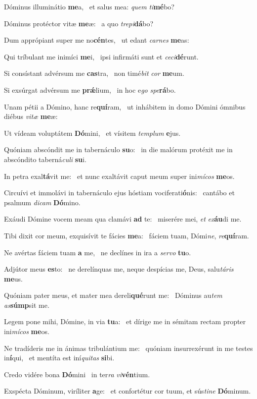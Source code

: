\item Dóminus illuminátio \textbf{me}a,~\psstar{} et salus mea: \textit{quem} \textit{ti}\textbf{mé}bo?
\item Dóminus protéctor vitæ \textbf{me}æ:~\psstar{} a quo \textit{trepi}\textbf{dá}bo?
\item Dum apprópiant super me no\textbf{cén}tes,~\psstar{} ut edant \textit{carnes} \textbf{me}as:
\item Qui tríbulant me inimíci \textbf{me}i,~\psstar{} ipsi infirmáti sunt et \textit{ceci}\textbf{dé}runt.
\item Si consístant advérsum me \textbf{cas}tra,~\psstar{} non timé\textit{bit} \textit{cor} \textbf{me}um.
\item Si exsúrgat advérsum me \textbf{prǽ}lium,~\psstar{} in hoc e\textit{go} \textit{spe}\textbf{rá}bo.
\item Unam pétii a Dómino, hanc re\textbf{quí}ram,~\psstar{} ut inhábitem in domo Dómini ómnibus diébus \textit{vitæ} \textbf{me}æ:
\item Ut vídeam voluptátem \textbf{Dó}mini,~\psstar{} et vísitem \textit{templum} \textbf{e}jus.
\item Quóniam abscóndit me in tabernáculo \textbf{su}o:~\psstar{} in die malórum protéxit me in abscóndito taberná\textit{culi} \textbf{su}i.
\item In petra exal\textbf{tá}vit me:~\psstar{} et nunc exaltávit caput meum super ini\textit{mícos} \textbf{me}os.
\item Circuívi et immolávi in tabernáculo ejus hóstiam vociferati\textbf{ó}nis:~\psstar{} cantábo et psalmum \textit{dicam} \textbf{Dó}mino.
\item Exáudi Dómine vocem meam qua clamávi \textbf{ad} te:~\psstar{} miserére mei, \textit{et} \textit{ex}\textbf{áu}di me.
\item Tibi dixit cor meum, exquisívit te fácies \textbf{me}a:~\psstar{} fáciem tuam, Dómi\textit{ne}, \textit{re}\textbf{quí}ram.
\item Ne avértas fáciem tuam \textbf{a} me,~\psstar{} ne declínes in ira a \textit{servo} \textbf{tu}o.
\item Adjútor meus \textbf{es}to:~\psstar{} ne derelínquas me, neque despícias me, Deus, salu\textit{táris} \textbf{me}us.
\item Quóniam pater meus, et mater mea dereli\textbf{qué}runt me:~\psstar{} Dóminus au\textit{tem} \textit{as}\textbf{súmp}sit me.
\item Legem pone mihi, Dómine, in via \textbf{tu}a:~\psstar{} et dírige me in sémitam rectam propter ini\textit{mícos} \textbf{me}os.
\item Ne tradíderis me in ánimas tribulántium me:~\pscross{} quóniam insurrexérunt in me testes in\textbf{í}qui,~\psstar{} et mentíta est iní\textit{quitas} \textbf{si}bi.
\item Credo vidére bona \textbf{Dó}mini~\psstar{} in ter\textit{ra} \textit{vi}\textbf{vén}tium.
\item Exspécta Dóminum, viríliter \textbf{a}ge:~\psstar{} et confortétur cor tuum, et sús\textit{tine} \textbf{Dó}minum.
